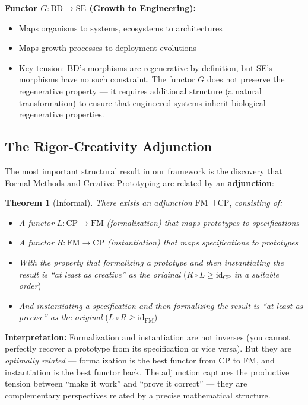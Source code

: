 \documentclass[11pt,a4paper]{article}
\begin{document}
\textbf{Functor $G: \mathrm{BD} \to \mathrm{SE}$ (Growth to Engineering):}
\begin{itemize}
    \item Maps organisms to systems, ecosystems to architectures
    \item Maps growth processes to deployment evolutions
    \item Key tension: BD's morphisms are regenerative by definition, but SE's morphisms have no such constraint. The functor $G$ does not preserve the regenerative property --- it requires additional structure (a natural transformation) to ensure that engineered systems inherit biological regenerative properties.
\end{itemize}

\subsection{The Rigor-Creativity Adjunction}

The most important structural result in our framework is the discovery that Formal Methods and Creative Prototyping are related by an \textbf{adjunction}:

\textbf{Theorem 1} (Informal). \textit{There exists an adjunction} $\mathrm{FM} \dashv \mathrm{CP}$, \textit{consisting of:}
\begin{itemize}
    \item \textit{A functor} $L: \mathrm{CP} \to \mathrm{FM}$ \textit{(formalization) that maps prototypes to specifications}
    \item \textit{A functor} $R: \mathrm{FM} \to \mathrm{CP}$ \textit{(instantiation) that maps specifications to prototypes}
    \item \textit{With the property that formalizing a prototype and then instantiating the result is ``at least as creative'' as the original} ($R \circ L \geq \mathrm{id}_{\mathrm{CP}}$ \textit{in a suitable order})
    \item \textit{And instantiating a specification and then formalizing the result is ``at least as precise'' as the original} ($L \circ R \geq \mathrm{id}_{\mathrm{FM}}$)
\end{itemize}

\textbf{Interpretation:} Formalization and instantiation are not inverses (you cannot perfectly recover a prototype from its specification or vice versa). But they are \emph{optimally related} --- formalization is the best functor from CP to FM, and instantiation is the best functor back. The adjunction captures the productive tension between ``make it work'' and ``prove it correct'' --- they are complementary perspectives related by a precise mathematical structure.
\end{document}
